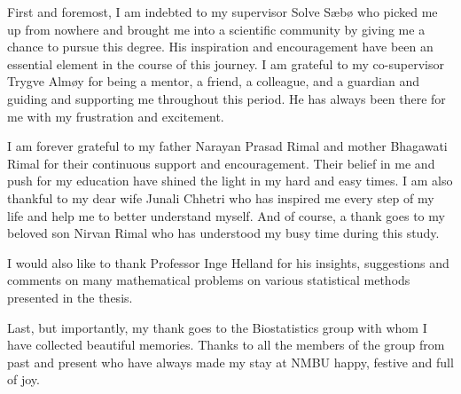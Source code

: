 First and foremost, I am indebted to my supervisor Solve Sæbø who picked
me up from nowhere and brought me into a scientific community by giving
me a chance to pursue this degree. His inspiration and encouragement
have been an essential element in the course of this journey. I am
grateful to my co-supervisor Trygve Almøy for being a mentor, a friend,
a colleague, and a guardian and guiding and supporting me throughout
this period. He has always been there for me with my frustration and
excitement.

I am forever grateful to my father Narayan Prasad Rimal and mother
Bhagawati Rimal for their continuous support and encouragement. Their
belief in me and push for my education have shined the light in my hard
and easy times. I am also thankful to my dear wife Junali Chhetri who
has inspired me every step of my life and help me to better understand
myself. And of course, a thank goes to my beloved son Nirvan Rimal who
has understood my busy time during this study.

I would also like to thank Professor Inge Helland for his insights,
suggestions and comments on many mathematical problems on various
statistical methods presented in the thesis.

Last, but importantly, my thank goes to the Biostatistics group with
whom I have collected beautiful memories. Thanks to all the members of
the group from past and present who have always made my stay at NMBU
happy, festive and full of joy.
